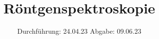 

\subject{V44}
\title{Röntgenspektroskopie}
\date{
  Durchführung: 24.04.23
  \hspace{3em}
  Abgabe: 09.06.23
}



\maketitle
\thispagestyle{empty}
\tableofcontents
\newpage








\newpage
\printbibliography{}
\nocite{matplotlib}
\nocite{numpy}
\nocite{scipy}
\nocite{uncertainties}
\nocite{reback2020pandas}

\newpage
% 


